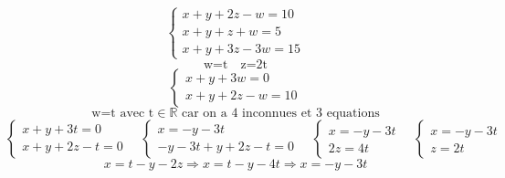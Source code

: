 \documentclass{article}
\begin{document}
\[ \begin{cases} x + y + 2z - w = 10 \\ x + y + z + w = 5 \\ x + y + 3z - 3w = 15 \end{cases} \]
\[ \text{w=t} \quad \text{z=2t} \]
\[ \begin{cases} x + y + 3w = 0 \\ x + y + 2z - w = 10 \end{cases} \]
\[ \text{w=t avec t} \in \mathbb{R} \text{ car on a 4 inconnues et 3 equations} \]
\[ \begin{cases} x + y + 3t = 0 \\ x + y + 2z - t = 0 \end{cases} \quad \begin{cases} x = -y - 3t \\ -y -3t + y + 2z - t = 0 \end{cases} \quad \begin{cases} x = -y - 3t \\ 2z = 4t \end{cases} \quad \begin{cases} x = -y - 3t \\ z = 2t \end{cases}\]
\[ x = t - y - 2z \Rightarrow x = t - y - 4t \Rightarrow x = -y - 3t \]
\end{document}
